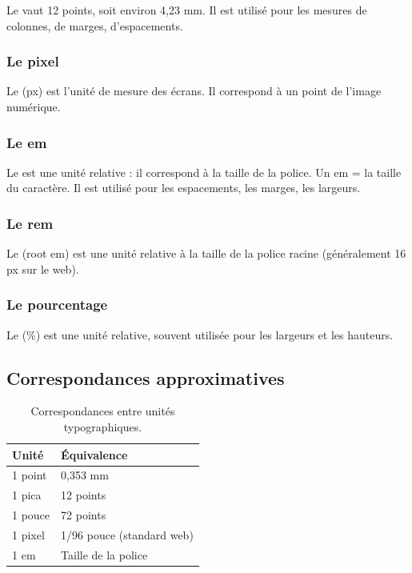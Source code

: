 Le  vaut 12 points, soit environ 4,23 mm. Il est utilisé pour les mesures de colonnes, de marges, d'espacements.

\subsubsection{Le pixel}

Le  (px) est l'unité de mesure des écrans. Il correspond à un point de l'image numérique.

\subsubsection{Le em}

Le  est une unité relative : il correspond à la taille de la police. Un em = la taille du caractère. Il est utilisé pour les espacements, les marges, les largeurs.

\subsubsection{Le rem}

Le  (root em) est une unité relative à la taille de la police racine (généralement 16 px sur le web).

\subsubsection{Le pourcentage}

Le  (\%) est une unité relative, souvent utilisée pour les largeurs et les hauteurs.

\subsection{Correspondances approximatives}

\begin{table}[h!]
\centering
\begin{tabular}{@{}ll@{}}
\toprule
\textbf{Unité} & \textbf{Équivalence} \\
\midrule
1 point & 0,353 mm \\
1 pica & 12 points \\
1 pouce & 72 points \\
1 pixel & 1/96 pouce (standard web) \\
1 em & Taille de la police \\
\bottomrule
\end{tabular}
\caption{Correspondances entre unités typographiques.}
\end{table}

